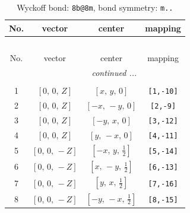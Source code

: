 \documentclass[fleqn,8pt]{jsarticle}
\begin{document}
\begin{longtable}{cccc}
\caption{Wyckoff bond: {\tt 8b@8m}, bond symmetry: {\tt m..}}
 \\
 \hline \hline
No. & vector & center & mapping \\ \hline \endfirsthead

\multicolumn{3}{l}{\tablename\ \thetable{}} \\
 \hline \hline
No. & vector & center & mapping \\ \hline \endhead

 \hline \hline
\multicolumn{3}{r}{\footnotesize\it continued ...} \\ \endfoot

 \hline \hline
\multicolumn{3}{r}{} \\ \endlastfoot

1 & $\left[ 0,\, 0,\, Z \right]$ & $\left[ x,\, y,\, 0 \right]$ & {\tt [1,-10]} \\ \hline
2 & $\left[ 0,\, 0,\, Z \right]$ & $\left[ - x,\, - y,\, 0 \right]$ & {\tt [2,-9]} \\ \hline
3 & $\left[ 0,\, 0,\, Z \right]$ & $\left[ - y,\, x,\, 0 \right]$ & {\tt [3,-12]} \\ \hline
4 & $\left[ 0,\, 0,\, Z \right]$ & $\left[ y,\, - x,\, 0 \right]$ & {\tt [4,-11]} \\ \hline
5 & $\left[ 0,\, 0,\, - Z \right]$ & $\left[ - x,\, y,\, \frac{1}{2} \right]$ & {\tt [5,-14]} \\ \hline
6 & $\left[ 0,\, 0,\, - Z \right]$ & $\left[ x,\, - y,\, \frac{1}{2} \right]$ & {\tt [6,-13]} \\ \hline
7 & $\left[ 0,\, 0,\, - Z \right]$ & $\left[ y,\, x,\, \frac{1}{2} \right]$ & {\tt [7,-16]} \\ \hline
8 & $\left[ 0,\, 0,\, - Z \right]$ & $\left[ - y,\, - x,\, \frac{1}{2} \right]$ & {\tt [8,-15]} \\
\end{longtable}
\renewcommand{\arraystretch}{1.2}
\end{document}
